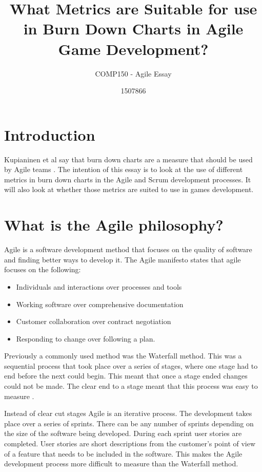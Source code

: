 \documentclass{scrartcl}
\title{What Metrics are Suitable for use in Burn Down Charts in Agile Game Development?}
\subtitle{COMP150 - Agile Essay}
\author{1507866}
\begin{document}
	
\maketitle
	
	
\section{Introduction}

Kupianinen et al say that burn down charts are a measure that should be used by Agile teams \cite{Kupiainen}. The intention of this essay is to look at the use of different metrics in burn down charts in the Agile and Scrum development processes. It will also look at whether those metrics are suited to use in games development.

\section{What is the Agile philosophy?}

Agile is a software development method that focuses on the quality of software and finding better ways to develop it. The Agile manifesto states that agile focuses on the following:

\begin{itemize}
	\item Individuals and interactions over processes and tools
	\item Working software over comprehensive documentation
	\item Customer collaboration over contract negotiation
	\item Responding to change over following a plan. \cite{AgileManifesto}  
\end{itemize} 

Previously a commonly used method was the Waterfall method. This was a sequential process that took place over a series of stages, where one stage had to end before the next could begin. This meant that once a stage ended changes could not be made. The clear end to a stage meant that this process was easy to measure \cite{Duka}.

Instead of clear cut stages Agile is an iterative process. The development takes place over a series of sprints. There can be any number of sprints depending on the size of the software being developed.  During each sprint user stories are completed. User stories are short descriptions from the customer's point of view of a feature that needs to be included in the software. This makes the Agile development process more difficult to measure than the Waterfall method.
\end{document}
